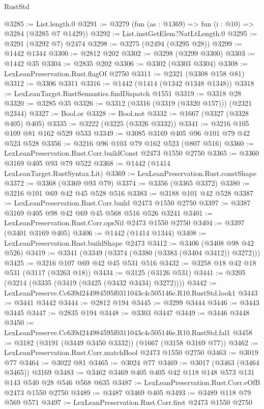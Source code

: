 \begin{lexlean}{RustStd}
\begin{coremodule}
@3285 := List.length.{0}
@3291 := @3279 (fun (as : @1369) => fun (i : @10) => @3284 (@3285 @7 @1429))
@3292 := List.instGetElem?NatLtLength.{0}
@3295 := @3291 (@3292 @7) @2474
@3298 := @3275 (@2494 (@3295 @28))
@3299 := @1442 @1344
@3300 := @2812 @202
@3302 := @3298 (@3299 @3300)
@3303 := @1442 @35
@3304 := @2835 @202
@3306 := @3302 (@3303 @3304)
@3308 := LexLeanPreservation.Rust.flagOf @2750
@3311 := @2321 (@3308 @158 @81)
@3312 := @3306 @3311
@3316 := @1442 (@1414 (@1342 @1348 @1348))
@3318 := LexLeanTarget.RustSemantics.findDispatch @1551
@3319 := @3318 @28
@3320 := @3285 @35
@3326 := @3312 (@3316 (@3319 (@3320 @157))) (@2321 @2344)
@3327 := Bool.or
@3328 := Bool.not
@3332 := @1667 (@3327 (@3328 @405) @405)
@3335 := @3222 (@3225 (@3326 @3332))
@3341 := @3216 @105 @109 @81 @162 @529 @533
@3349 := @3085 @3169 @405 @96 @101 @79 @42 @523 @528
@3356 := @3216 @96 @103 @79 @162 @523 (@807 @516)
@3360 := LexLeanPreservation.Rust.Corr.buildConst @2473 @1550 @2750
@3365 := @3360 @3169 @405 @93 @79 @522
@3368 := @1442 (@1414 LexLeanTarget.RustSyntax.Lit)
@3369 := LexLeanPreservation.Rust.constShape
@3372 := @3368 (@3369 @93 @79)
@3374 := @3356 (@3365 @3372)
@3380 := @3216 @101 @69 @42 @45 @528 @516
@3383 := @3188 @101 @42 @528
@3387 := LexLeanPreservation.Rust.Corr.build @2473 @1550 @2750
@3397 := @3387 @3169 @405 @98 @42 @69 @45 @568 @516 @526 @3241
@3401 := LexLeanPreservation.Rust.Corr.opsNil @2473 @1550 @2750
@3404 := @3397 (@3401 @3169 @405)
@3406 := @1442 (@1414 @1344)
@3408 := LexLeanPreservation.Rust.buildShape @2473
@3412 := @3406 (@3408 @98 @42 @526)
@3419 := @3341 (@3349 (@3374 (@3380 (@3383 (@3404 @3412)) @3272)))
@3425 := @3216 @107 @69 @42 @45 @531 @516
@3432 := @3258 @18 @42 @18 @531 (@3117 (@3263 @18))
@3434 := @3125 (@3126 @531)
@3441 := @3205 (@3214 (@3335 (@3419 (@3425 (@3432 @3434) @3272))))
@3442 := LexLeanPreserve.Cc639d244984595f0311043c4c505146e.R10.RustStd.look1
@3443 := @3441 @3442
@3444 := @2812 @194
@3445 := @3299 @3444
@3446 := @3443 @3445
@3447 := @2835 @194
@3448 := @3303 @3447
@3449 := @3446 @3448
@3450 := LexLeanPreserve.Cc639d244984595f0311043c4c505146e.R10.RustStd.fal1
@3458 := @3182 (@3191 (@3449 @3450 @3332)) (@1667 (@3158 @3169 @77))
@3462 := LexLeanPreservation.Rust.Corr.matchBool @2473 @1550 @2750
@3463 := @3019 @77
@3464 := @3022 @81
@3465 := @3024 @77
@3469 := @3017 (@3463 (@3464 @3465)) @3169
@3483 := @3462 @3469 @405 @405 @42 @118 @148 @573 @131 @143 @540 @28 @546 @568 @635
@3487 := LexLeanPreservation.Rust.Corr.eOfB @2473 @1550 @2750
@3489 := @3487 @3469 @405
@3493 := @3489 @118 @79 @569 @571
@3497 := LexLeanPreservation.Rust.Corr.first @2473 @1550 @2750

\end{coremodule}
\end{lexlean}

